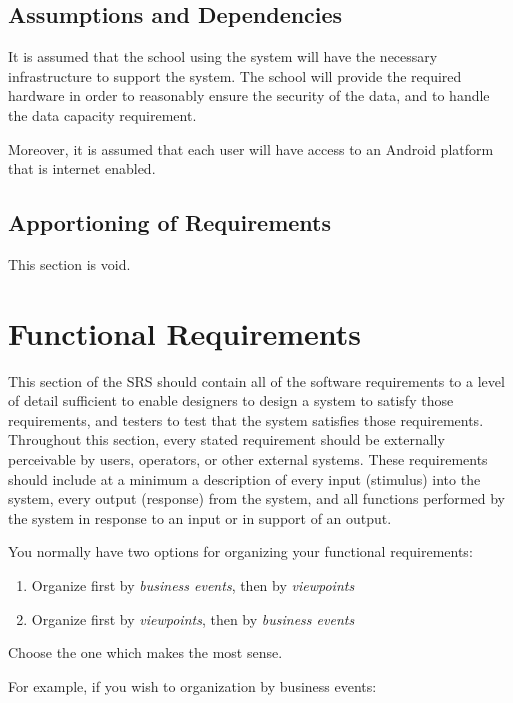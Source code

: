 \documentclass[]{article}
\begin{document}
\subsection{Assumptions and Dependencies}
\label{sub:assumptions_and_dependencies}
It is assumed that the school using the system will have the necessary infrastructure to support the system. The school will provide the required hardware in order to reasonably ensure the security of the data, and to handle the data capacity requirement.

Moreover, it is assumed that each user will have access to an Android platform that is internet enabled.

\subsection{Apportioning of Requirements}
\label{sub:apportioning_of_requirements}
This section is void.


\section{Functional Requirements}
\label{sec:functional_requirements}
This section of the SRS should contain all of the software requirements to a 
level of detail sufficient to enable designers to design a system to satisfy 
those requirements, and testers to test that the system satisfies those 
requirements. Throughout this section, every stated requirement should be 
externally perceivable by users, operators, or other external systems. These 
requirements should include at a minimum a description of every input (stimulus) 
into the system, every output (response) from the system, and all functions 
performed by the system in response to an input or in support of an output.

You normally have two options for organizing your functional requirements:
\begin{enumerate}
	\item Organize first by \emph{business events}, then by \emph{viewpoints}
	\item Organize first by \emph{viewpoints}, then by \emph{business events}
\end{enumerate}
Choose the one which makes the most sense.

For example, if you wish to organization by business events:
\end{document}
